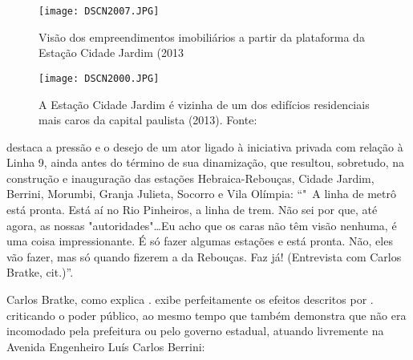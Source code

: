 \documentclass[11pt,fleqn]{book} %
\begin{document}
\begin{landscape}
\begin{figure}[h!]
	\centering
	\caption{Visão dos empreendimentos imobiliários a partir da plataforma da Estação Cidade Jardim (2013} 
	\texttt{[image: DSCN2007.JPG]}
\end{figure}
\end{landscape}

\begin{landscape}
\begin{figure}[h!]
	\centering
	\caption{A Estação Cidade Jardim é vizinha de um dos edifícios residenciais mais caros da capital paulista (2013). Fonte: \cite{apecaro}} 
	\texttt{[image: DSCN2000.JPG]}
\end{figure}
\end{landscape}

\cite[pág. 201]{Frugoli} destaca a pressão e o desejo de um ator ligado à iniciativa privada com relação à Linha 9, ainda antes do término de sua dinamização, que resultou, sobretudo, na construção e inauguração das estações Hebraica-Rebouças, Cidade Jardim, Berrini, Morumbi, Granja Julieta, Socorro e Vila Olímpia\cite[pág. 38]{Ferreira}: ``"\textemdash\ A linha de metrô está pronta. Está aí no Rio Pinheiros, a linha de trem. Não sei por que, até agora, as nossas "autoridades"\dots Eu acho que os caras não têm visão nenhuma, é uma coisa impressionante. É só fazer algumas estações e está pronta. Não, eles vão fazer, mas só quando fizerem a da Rebouças. Faz já! (Entrevista com Carlos Bratke, cit.)''.

Carlos Bratke, como explica \cite{Frugoli}. exibe perfeitamente os efeitos descritos por \cite{Acselrad}. criticando o poder público, ao mesmo tempo que também demonstra que não era incomodado pela prefeitura ou pelo governo estadual, atuando livremente na Avenida Engenheiro Luís Carlos Berrini:
\end{document}

